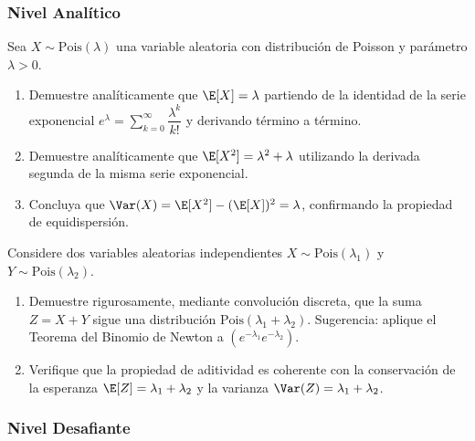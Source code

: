 \subsubsection*{Nivel Analítico}

\begin{problema}
	\label{prob:3.7.7}
	Sea $X \sim \text{Pois}(\lambda)$ una variable aleatoria con distribución de Poisson y parámetro $\lambda > 0$.
	\begin{enumerate}
		\item Demuestre analíticamente que $\E[X] = \lambda$ partiendo de la identidad de la serie exponencial $e^{\lambda} = \sum_{k=0}^{\infty} \dfrac{\lambda^{k}}{k!}$ y derivando término a término.
		\item Demuestre analíticamente que $\E[X^{2}] = \lambda^{2} + \lambda$ utilizando la derivada segunda de la misma serie exponencial.
		\item Concluya que $\Var(X) = \E[X^{2}] - (\E[X])^{2} = \lambda$, confirmando la propiedad de equidispersión.
	\end{enumerate}
\end{problema}

\begin{problema}
	\label{prob:3.7.8}
	Considere dos variables aleatorias independientes $X \sim \text{Pois}(\lambda_{1})$ y $Y \sim \text{Pois}(\lambda_{2})$.
	\begin{enumerate}
		\item Demuestre rigurosamente, mediante convolución discreta, que la suma $Z = X + Y$ sigue una distribución $\text{Pois}(\lambda_{1} + \lambda_{2})$. Sugerencia: aplique el Teorema del Binomio de Newton a $(e^{-\lambda_{1}} e^{-\lambda_{2}})$.
		\item Verifique que la propiedad de aditividad es coherente con la conservación de la esperanza $\E[Z] = \lambda_{1} + \lambda_{2}$ y la varianza $\Var(Z) = \lambda_{1} + \lambda_{2}$.
	\end{enumerate}
\end{problema}

\subsubsection*{Nivel Desafiante}

